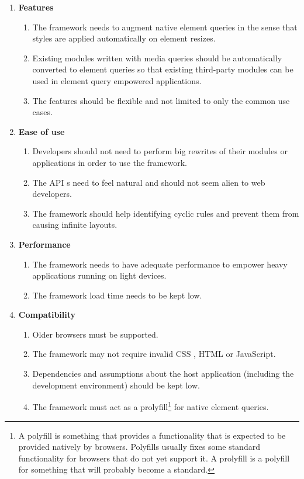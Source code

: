 \documentclass[a4paper,11pt]{kth-mag}
\newcommand\abbr[2][]{\uppercase{#2}\ifthenelse{\equal{#1}{}}%
                     {}{#1}}
\begin{document}
        \begin{enumerate}
          \item \textbf{Features}
            \begin{enumerate}
              \item\label{itm:req_resize_detect} The framework needs to augment native element queries in the sense that styles are applied automatically on element resizes.
              \item Existing modules written with media queries should be automatically converted to element queries so that existing third-party modules can be used in element query empowered applications.
              \item The features should be flexible and not limited to only the common use cases.
            \end{enumerate}
          \item \textbf{Ease of use}
            \begin{enumerate}
              \item\label{itm:req_big_rewrite} Developers should not need to perform big rewrites of their modules or applications in order to use the framework.
              \item\label{itm:natural} The \abbr[s]{api} need to feel natural and should not seem alien to web developers.
              \item The framework should help identifying cyclic rules and prevent them from causing infinite layouts.
            \end{enumerate}
          \item \textbf{Performance}
            \begin{enumerate}
              \item The framework needs to have adequate performance to empower heavy applications running on light devices.
              \item The framework load time needs to be kept low.
            \end{enumerate}
          \item \textbf{Compatibility}
            \begin{enumerate}
              \item Older browsers must be supported.
              \item The framework may not require invalid \abbr{css}, \abbr{html} or JavaScript.
              \item\label{itm:assumption} Dependencies and assumptions about the host application (including the development environment) should be kept low.
              \item\label{itm:req_prolyfill} The framework must act as a prolyfill\footnote{A polyfill is something that provides a functionality that is expected to be provided natively by browsers. Polyfills usually fixes some standard functionality for browsers that do not yet support it. A prolyfill is a polyfill for something that will probably become a standard.} for native element queries.
            \end{enumerate}
        \end{enumerate}
\end{document}
